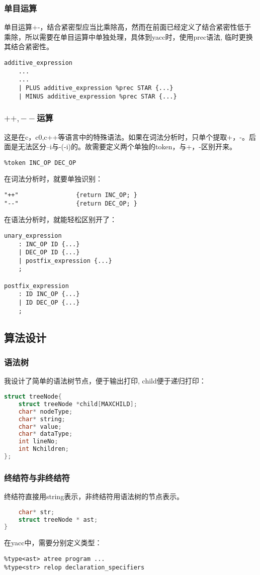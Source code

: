 \documentclass{article}
\begin{document}
\begin{CJK}{UTF8}{gkai}
\subsubsection{单目运算}

单目运算+-，结合紧密型应当比乘除高，然而在前面已经定义了结合紧密性低于乘除，所以需要在单目运算中单独处理，具体到yacc时，使用prec语法, 临时更换其结合紧密性。
\begin{verbatim}
additive_expression
    ...
    ...
    | PLUS additive_expression %prec STAR {...}
    | MINUS additive_expression %prec STAR {...}
\end{verbatim}

\subsubsection{$++,--$运算}
这是在c，c0,c++等语言中的特殊语法。如果在词法分析时，只单个提取+，-。后面是无法区分--i与-(-i)的。故需要定义两个单独的token，与+，-区别开来。
\begin{verbatim}
%token INC_OP DEC_OP
\end{verbatim}
在词法分析时，就要单独识别：
\begin{verbatim}
"++"				{return INC_OP; }
"--"				{return DEC_OP; }
\end{verbatim}
在语法分析时，就能轻松区别开了：
\begin{verbatim}
unary_expression 
    : INC_OP ID {...}
    | DEC_OP ID {...}
    | postfix_expression {...}
    ;

postfix_expression
    : ID INC_OP {...}
    | ID DEC_OP {...}
    ;
\end{verbatim}

\subsection{算法设计}

\subsubsection{语法树}
我设计了简单的语法树节点，便于输出打印, child便于递归打印：
\begin{lstlisting}[language=c]
struct treeNode{
    struct treeNode *child[MAXCHILD];
    char* nodeType;
    char* string;
    char* value;
    char* dataType;
    int lineNo;
    int Nchildren;
};
\end{lstlisting}
\subsubsection{终结符与非终结符}
终结符直接用string表示，非终结符用语法树的节点表示。
\begin{lstlisting}[language=c]
%union {
    char* str;
    struct treeNode * ast;
}
\end{lstlisting}
在yacc中，需要分别定义类型：
\begin{verbatim}
%type<ast> atree program ...
%type<str> relop declaration_specifiers 
\end{verbatim}


\end{CJK}
\end{document}
